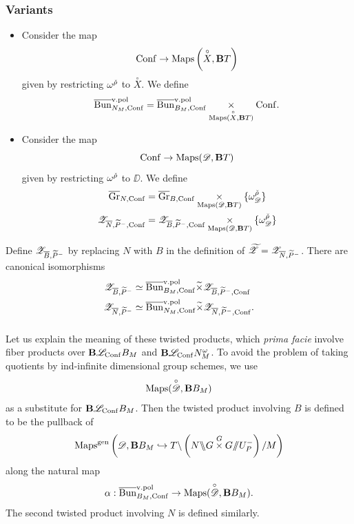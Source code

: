 \subsubsection{Variants}
\begin{itemize}
    \item Consider the map
        \[
        \mathrm{Conf} \to \mathrm{Maps}\left(\overset{\circ}{X}, \mathbf{B} T \right)
        \]
    given by restricting $\omega^{\check{\rho}}$ to $\overset{\circ}{X}$. We define
        \[
        \overline{\mathrm{Bun}}_{N_M, \mathrm{Conf}}^{\mathrm{v.}\mathrm{pol}} = \overline{\mathrm{Bun}}_{B_M, \mathrm{Conf}}^{\mathrm{v.}\mathrm{pol}} \underset{\mathrm{Maps}(\overset{\circ}{X}, \mathbf{B} T)}{\times} \mathrm{Conf}.
        \]
    \item Consider the map
        \[
        \mathrm{Conf} \to \mathrm{Maps}(\mathscr{D}, \mathbf{B} T)
        \]
    given by restricting $\omega^{\check{\rho}}$ to $\DD$. We define
        \begin{align*}
            \overline{\mathrm{Gr}}_{N,\mathrm{Conf}} &= \overline{\mathrm{Gr}}_{B,\mathrm{Conf}} \underset{\mathrm{Maps}(\mathscr{D}, \mathbf{B} T)}{\times} \{\omega_{\mathscr{D}}^{\check{\rho}}\} \\
            \mathscr{Z}_{\overline{N}, \widetilde{P}^-, \mathrm{Conf}} &= \mathscr{Z}_{\overline{B}, \widetilde{P}^-, \mathrm{Conf}} \underset{\mathrm{Maps}(\mathscr{D}, \mathbf{B} T)}{\times} \{\omega_{\mathscr{D}}^{\check{\rho}}\}
        \end{align*}
\end{itemize}

\begin{proposition}
\label{proposition:zast_loc_formula}
Define $\mathscr{Z}_{\overline{B}, \widetilde{P}^-}$ by replacing $N$ with $B$ in the definition of ${\widetilde{\mathscr{Z}}} = \mathscr{Z}_{\overline{N}, \widetilde{P}^-}$. There are canonical isomorphisms
    \begin{align*}
        \mathscr{Z}_{\overline{B}, \widetilde{P}^-} & \simeq \overline{\mathrm{Bun}}_{B_M, \mathrm{Conf}}^{{\mathrm{v.}\mathrm{pol}}} \widetilde{\times} \mathscr{Z}_{\overline{B}, \widetilde{P}^-, \mathrm{Conf}} \\
        \mathscr{Z}_{\overline{N}, \widetilde{P}^-} & \simeq \overline{\mathrm{Bun}}_{N_M, \mathrm{Conf}}^{{\mathrm{v.}\mathrm{pol}}} \widetilde{\times} \mathscr{Z}_{\overline{N}, \widetilde{P}^-, \mathrm{Conf}}.
    \end{align*}
\end{proposition}

\subsubsection{} Let us explain the meaning of these twisted products, which \emph{prima facie} involve fiber products over $\mathbf{B} \mathscr{L}_{\mathrm{Conf}} B_M$ and $\mathbf{B} \mathscr{L}_{\mathrm{Conf}} N_M^\omega$. To avoid the problem of taking quotients by ind-infinite dimensional group schemes, we use
    \[\mathrm{Maps}(\overset{\circ}{\mathscr{D}}, \mathbf{B} B_M)\]
as a substitute for $\mathbf{B} \mathscr{L}_{\mathrm{Conf}} B_M$. Then the twisted product involving $B$ is defined to be the pullback of 
\begin{equation}
\label{eqn:Zast_descent}
    \mathrm{Maps}^{\mathrm{gen}}\left(\mathscr{D}, \mathbf{B} B_M \hookrightarrow T \backslash \left( N \backslash\!\!\backslash G \overset{G}{\times} G / \!\! / U_P^- \right) / M \right)
\end{equation}
along the natural map
    \[
    \alpha : \overline{\mathrm{Bun}}_{B_M, \mathrm{Conf}}^{\mathrm{v.}\mathrm{pol}} \to \mathrm{Maps}(\overset{\circ}{\mathscr{D}}, \mathbf{B} B_M).
    \]
The second twisted product involving $N$ is defined similarly.

